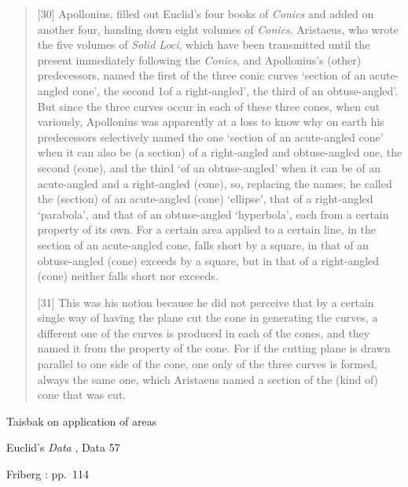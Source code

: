 \documentclass{article}
\begin{document}
\begin{quote}
[30] Apollonius, filled out Euclid's four books of {\em Conics} and added on another four, handing down eight volumes of {\em Conics}. Aristaeus, who wrote the five volumes of
{\em Solid Loci}, which have been transmitted until the present immediately following the {\em Conics}, and Apollonius's (other) predecessors, named the first of the three conic curves `section of an acute-angled cone', the second 1of a right-angled', the third of an obtuse-angled'. But since the three curves occur in each of these three cones, when cut
 variously, Apollonius was apparently at a loss to know why on earth his predecessors selectively named the one `section of an acute-angled cone' when it can also
 be (a section) of a right-angled and obtuse-angled one, the second (cone), and the third `of an obtuse-angled' when it can be of an
 acute-angled and a right-angled (cone), so, replacing the names, he called the (section) of an acute-angled (cone) `ellipse', that of a right-angled `parabola', and that of an
 obtuse-angled `hyperbola', each from a certain property of its own. For a certain area applied to a certain line, in the section of an acute-angled cone, falls short by a square, in that of an obtuse-angled (cone) exceeds by a square, but in that of a right-angled (cone) neither falls short nor exceeds.
 
 [31] This was his notion because he did not perceive that by a certain single way of having the plane cut the cone in generating the curves, a different one of the curves is produced in each of the cones, and they named it from the property of the cone. For if the cutting plane is drawn parallel to one side of the cone, one only of the three curves is formed, always the same one, which Aristaeus named a section of the (kind of) cone that was cut.
\end{quote}

Taisbak on application of areas \cite{taisbak2003}

Euclid's {\em Data} \cite{data}, Data 57

Friberg \cite{amazing}: pp.~114




\end{document}
